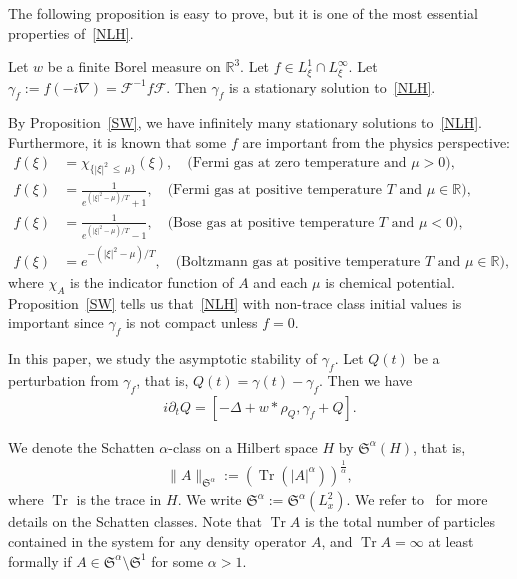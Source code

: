 \documentclass[AHL,Unicode,longabstracts,MathTools,published]{cedram}
\newcommand{\BR}{\mathbb{R}}
\newcommand{\CF}{\mathcal{F}}
\newcommand{\FS}{\mathfrak{S}}
\newcommand{\al}{\alpha}
\newcommand{\ga}{\gamma}
\newcommand{\rh}{\rho}
\newcommand{\ch}{\chi}
\newcommand{\De}{\Delta}
\newcommand{\pl}{\partial}
\newcommand{\K}[1]{\left(#1\right)}
\newcommand{\I}{\infty}
\DeclareMathOperator{\Tr}{Tr}
\newcommand{\R}{\mathbb{R}}
\begin{document}
The following proposition is easy to prove, but it is one of the most essential properties of~\eqref{NLH}.

\begin{prop}\label{SW}
Let $w$ be a finite Borel measure on $\BR^3$. Let $f \in L^1_\xi \cap L^\I_\xi$. Let $\ga_f := f(- i \nabla)= \CF^{-1} f \CF$. Then $\ga_f$ is a stationary solution to~\eqref{NLH}.
\end{prop}

By Proposition~\ref{SW}, we have infinitely many stationary solutions to~\eqref{NLH}. Furthermore, it is known that some $f$ are important from the physics perspective:
\begin{align}
f(\xi) &= \ch_{\{|\xi|^2\,\leq\,\mu\}}(\xi),\quad \text{(Fermi gas at zero temperature and $\mu >0$)}, \label{P1}
\\
f(\xi) &= \frac{1}{e^{(|\xi|^2-\mu)/T}+1}, \quad \text{(Fermi gas at positive temperature $T$ and $\mu \in \R$)}, \label{P2}
\\
f(\xi) &= \frac{1}{e^{(|\xi|^2-\mu)/T}-1}, \quad \text{(Bose gas at positive temperature $T$ and $\mu < 0$)}, \label{P3}
\\
f(\xi) &= e^{-(|\xi|^2-\mu)/T}, \quad \text{(Boltzmann gas at positive temperature $T$ and $\mu \in \R$)}, \label{P4}
\end{align}
where $\ch_A$ is the indicator function of $A$ and each $\mu$ is chemical potential. Proposition~\ref{SW} tells us that~\eqref{NLH} with non-trace class initial values is important since $\ga_f$ is not compact unless $f=0$.

In this paper, we study the asymptotic stability of $\ga_f$. Let $Q(t)$ be a perturbation from $\ga_f$, that is, $Q(t) = \ga(t) - \ga_f$. Then we have
\begin{align}\label{$f$-NLH}
\tag{$f$-NLH} 
i \pl_t Q = [-\De + w \ast \rh_Q, \ga_f + Q].
\end{align}

We denote the Schatten $\al$-class on a Hilbert space $H$ by $\FS^\al(H)$, that is,
\begin{align}
\|A\|_{\FS^\al}:= \K{\Tr(|A|^\al) }^{\frac{1}{\al}},
\end{align}
where $\Tr$ is the trace in $H$. We write $\FS^\al:=\FS^\al(L^2_x)$. We refer to~\cite{2005Simon} for more details on the Schatten classes. Note that $\Tr A$ is the total number of particles contained in the system for any density operator $A$, and $\Tr A = \I$ at least formally if $A \in \FS^\al \setminus \FS^1$ for some $\al >1$.
\end{document}

